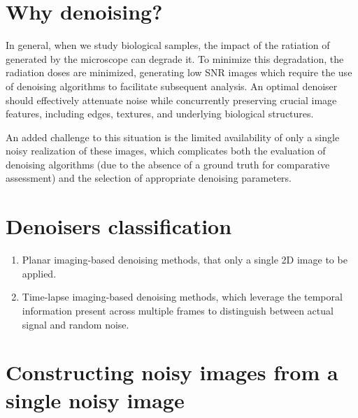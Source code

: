 
\section{Why denoising?}
\label{sec:why_denoising}


In general, when we study biological samples, the impact of the
ratiation of generated by the microscope can degrade it. To minimize
this degradation, the radiation doses are minimized, generating low
\gls{SNR} images which require the use of denoising algorithms to
facilitate subsequent analysis. An optimal denoiser should
effectively attenuate noise while concurrently preserving crucial
image features, including edges, textures, and underlying biological
structures.

An added challenge to this situation is the limited availability of
only a single noisy realization of these images, which complicates
both the evaluation of denoising algorithms (due to the absence of a
ground truth for comparative assessment) and the selection of
appropriate denoising parameters. 


\section{Denoisers classification}

\begin{enumerate}
  
\item Planar imaging-based denoising methods, that only a single 2D image to be applied.



\item Time-lapse imaging-based denoising methods, which leverage the
  temporal information present across multiple frames to distinguish
  between actual signal and random noise.
  


\end{enumerate}

\section{Constructing noisy images from a single noisy image}

